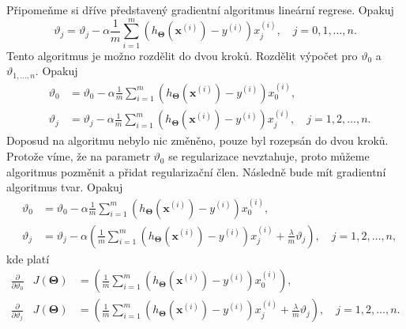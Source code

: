 \par{Připomeňme si dříve představený gradientní algoritmus lineární regrese. Opakuj
\begin{equation}
	\vartheta_j = \vartheta_j - \alpha \frac{1}{m} \sum_{i = 1}^{m} \left( h_{\bm{\Theta}} \left( \bm{x}^{\left( i \right)} \right) - y^{\left( i \right)} \right) x_j^{\left( i \right)}, \quad j = 0,1,\ldots ,n .
\end{equation}
Tento algoritmus je možno rozdělit do dvou kroků. Rozdělit výpočet pro $\vartheta_0$ a $\vartheta_{1,\ldots, n}$. Opakuj
\begin{eqnarray}
	&\vartheta_0 &= \vartheta_0 - \alpha \frac{1}{m} \sum_{i = 1}^{m} \left( h_{\bm{\Theta}} \left( \bm{x}^{\left( i \right)} \right) - y^{\left( i \right)} \right) x_0^{\left( i \right)},\\
	&\vartheta_j &= \vartheta_j - \alpha \frac{1}{m} \sum_{i = 1}^{m} \left( h_{\bm{\Theta}} \left( \bm{x}^{\left( i \right)} \right) - y^{\left( i \right)} \right) x_j^{\left( i \right)}, \quad j = 1,2,\ldots ,n .
\end{eqnarray}
Doposud na algoritmu nebylo nic změněno, pouze byl rozepsán do dvou kroků. Protože víme, že na parametr $\vartheta_0$ se regularizace nevztahuje, proto můžeme algoritmus pozměnit a přidat regularizační člen. Následně bude mít gradientní algoritmus tvar. Opakuj
\begin{eqnarray}
	&\vartheta_0 &= \vartheta_0 - \alpha \frac{1}{m} \sum_{i = 1}^{m} \left( h_{\bm{\Theta}} \left( \bm{x}^{\left( i \right)} \right) - y^{\left( i \right)} \right) x_0^{\left( i \right)},\\
	&\vartheta_j &= \vartheta_j - \alpha \left( \frac{1}{m} \sum_{i = 1}^{m} \left( h_{\bm{\Theta}} \left( \bm{x}^{\left( i \right)} \right) - y^{\left( i \right)} \right) x_j^{\left( i \right)} + \frac{\lambda}{m} \vartheta_j \right), \quad j = 1,2,\ldots ,n,	
	\label{eq:LinearniRegreseGradientniAlgProJ1}
\end{eqnarray}
kde platí
\begin{eqnarray}
	\frac{\partial}{\partial \vartheta_0} &J \left( \bm{\Theta} \right)	&= \left( \frac{1}{m} \sum_{i = 1}^{m} \left( h_{\bm{\Theta}} \left( \bm{x}^{\left( i \right)} \right) - y^{\left( i \right)} \right) x_0^{\left( i \right)} \right),\\
	\frac{\partial}{\partial \vartheta_j} &J \left( \bm{\Theta} \right) &= \left( \frac{1}{m} \sum_{i = 1}^{m} \left( h_{\bm{\Theta}} \left( \bm{x}^{\left( i \right)} \right) - y^{\left( i \right)} \right) x_j^{\left( i \right)} + \frac{\lambda}{m} \vartheta_j \right), \quad j = 1,2,\ldots ,n.
\end{eqnarray}}

